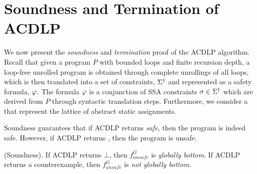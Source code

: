 \section{Soundness and Termination of ACDLP}
%
We now present the \emph{soundness} and \emph{termination} proof of the 
ACDLP algorithm.  Recall that given a program $P$ with bounded loops and 
finite recursion depth, a loop-free unrolled program is obtained through 
complete unrollings of all loops, which is then translated into a set of 
constraints, $\Sigma^\dagger$ and represented as a safety formula, $\varphi$.  
The formula $\varphi$ is a conjunction of SSA constraints 
$\sigma \in \Sigma^\dagger$ which are derived from $P$ through 
syntactic translation steps.  Furthermore, we consider a 
 that represent the lattice of 
abstract static assignments. 

Soundness guarantees that if ACDLP returns \emph{safe}, then the program is 
indeed safe.  However, if ACDLP returns , then the program is 
unsafe.
\begin{theorem} (Soundness).  
If ACDLP returns $\bot$, then $f_{unsafe}^G$ is \emph{globally bottom}. 
If ACDLP returns a counterexample, then $f_{unsafe}^G$ is \emph{not globally bottom}. 
\end{theorem}


